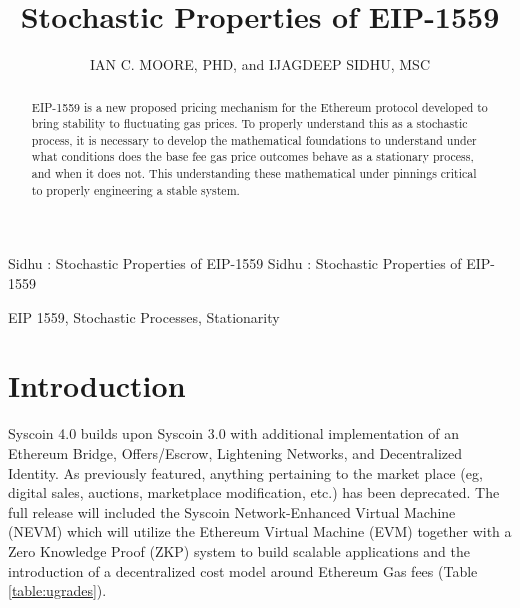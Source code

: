 \documentclass[peerreview]{ieeesyscoin}
\begin{document}
\linenumbers
\history{}

\title{\centering Stochastic Properties of EIP-1559}
\author{\centering  \uppercase{Ian C. Moore, PhD}, 
and \uppercase{IJagdeep Sidhu, MSc}}

\address[1]{\centering  (e-mail: ic3moore@gmail.com)}
\tfootnote{}
\address[2]{\centering Syscoin Core Developer, Blockchain Foundry Inc.(e-mail: jsidhu@blockchainfoundry.co)}


\markboth
{Sidhu \headeretal: Stochastic Properties of EIP-1559}
{Sidhu \headeretal: Stochastic Properties of EIP-1559}

\corresp{}

\begin{abstract}
EIP-1559 is a new proposed pricing mechanism for the Ethereum protocol developed to bring stability to fluctuating gas prices. To properly understand this as a stochastic process, it is necessary to develop the mathematical foundations to understand under what conditions does the base fee gas price outcomes behave as a stationary process, and when it does not. This understanding these mathematical under pinnings critical to properly engineering a stable system.
\end{abstract}

\begin{keywords}
EIP 1559, Stochastic Processes, Stationarity
\end{keywords}

\titlepgskip=-15pt

\maketitle

\section{Introduction}
\label{sec:introduction}

Syscoin 4.0 builds upon Syscoin 3.0 with additional implementation of an Ethereum Bridge, Offers/Escrow, Lightening Networks, and Decentralized Identity. As previously featured, anything pertaining to the market place (eg, digital sales, auctions, marketplace modification, etc.) has been deprecated. The full release will included the Syscoin Network-Enhanced Virtual Machine (NEVM) which will utilize the Ethereum Virtual Machine (EVM) together with a Zero Knowledge Proof (ZKP) system to build scalable applications and the introduction of a decentralized cost model around Ethereum Gas fees (Table \ref{table:ugrades}).
\end{document}
